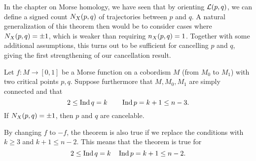 In the chapter on Morse homology, we have seen that by orienting $\mathcal L(p, q)$, we can define a signed count $N_{X}(p, q)$ of trajectories between $p$ and $q$.
A natural generalization of this theorem then would be to consider cases where $N_{X}(p, q) = \pm 1$, which is weaker than requiring $n_{X}(p, q) = 1$.
Together with some additional assumptions, this turns out to be sufficient for cancelling $p$ and  $q$, giving the first strengthening of our cancellation result.

\begin{theorem}
    Let $f: M \to  [0,1]$ be a Morse function on a cobordism $M$ (from $M_0$ to $M_1$) with two critical points $p, q$.
    Suppose furthermore that $M, M_0, M_1$ are simply connected and that
    \[
    2 \le \operatorname{Ind} q = k  \qquad \operatorname{Ind} p = k+1 \le  n-3
    .\] 
    If $N_{X}(p, q) = \pm 1$, then  $p$ and  $q$ are cancelable.
    \label{thm:cancel-second}
\end{theorem}
\begin{remark}
    By changing $f$ to $-f$, the theorem is also true if we replace the conditions with  $k \ge  3$ and $k + 1 \le  n-2$.
    This means that the theorem is true for 
    \[
    2 \le  \operatorname{Ind} q = k \quad \operatorname{Ind} p = k + 1 \le n-2
    .\] 
\end{remark}

